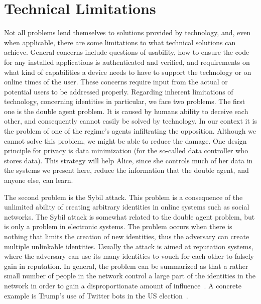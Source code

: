 \section{Technical Limitations}
\label{TechnicalLimitations}

Not all problems lend themselves to solutions provided by technology,
and, even when applicable, there are some 
limitations to what technical solutions can achieve. General concerns include
questions of usability, how to ensure the code for any installed
applications is authenticated and verified, and requirements on what kind
of capabilities a device needs to have to support the technology or on
online times of the user. These concerns require input from the actual
or potential users to be addressed properly. Regarding inherent
limitations of technology, concerning identities in particular, we face two problems.
The first one is the double agent problem.
It is caused by humans ability to deceive each other, and consequently cannot 
easily be solved by technology.
\label{DoubleAgentProblem}
In our context it is the problem of one of the regime's agents
infiltrating the opposition.
Although we cannot solve this problem, we might be able to reduce the
damage.  One design principle for privacy is data minimization (for
the so-called data controller who stores data). This strategy will
help Alice, since she controls much of her data in the systems we
present here, reduce the information that the double agent, and anyone
else, can learn.

The second problem is the Sybil attack.
This problem is a consequence of the unlimited ability of creating arbitrary 
identities in online systems such as social networks.
\label{SybilAttacks}
The Sybil attack is somewhat related to the double agent problem, but is only 
a problem in electronic systems.
The problem occurs when there is nothing that limits the creation of new 
identities, thus the adversary can create multiple unlinkable identities.
Usually the attack is aimed at reputation systems, where the adversary can use 
its many identities to vouch for each other to falsely gain in reputation.
In general, the problem can be summarized as that a rather small number of 
people in the network control a large part of the identities in the network in 
order to gain a disproportionate amount of influence~\cite{SybilAttack}.
A concrete example is Trump's use of Twitter bots in the US 
election~\cite{BotsAndAutomationDuringUSElection}.

